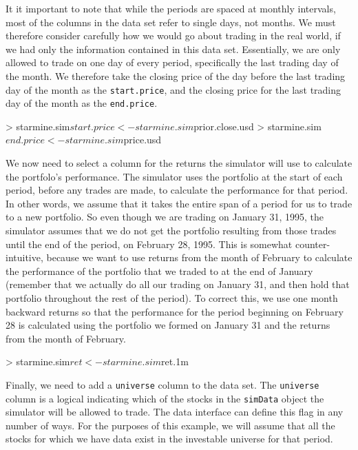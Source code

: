 \documentclass{article}
\begin{document}
It it important to note that while the periods are spaced at monthly
intervals, most of the columns in the data set refer to single days,
not months.  We must therefore consider carefully how we would go
about trading in the real world, if we had only the information
contained in this data set.  Essentially, we are only allowed to trade
on one day of every period, specifically the last trading day of the
month.  We therefore take the closing price of the day before the last
trading day of the month as the \texttt{start.price}, and the closing
price for the last trading day of the month as the \texttt{end.price}.

\begin{Schunk}
\begin{Sinput}
> starmine.sim$start.price <- starmine.sim$prior.close.usd
> starmine.sim$end.price <- starmine.sim$price.usd
\end{Sinput}
\end{Schunk}

We now need to select a column for the returns the simulator will use
to calculate the portfolo's performance.  The simulator uses the
portfolio at the start of each period, before any trades are made, to
calculate the performance for that period.  In other words, we assume
that it takes the entire span of a period for us to trade to a new
portfolio.  So even though we are trading on January 31, 1995, the
simulator assumes that we do not get the portfolio resulting from those
trades until the end of the period, on February 28, 1995.  This is
somewhat counter-intuitive, because we want to use returns from the
month of February to calculate the performance of the portfolio that
we traded to at the end of January (remember that we actually do all
our trading on January 31, and then hold that portfolio throughout the
rest of the period).  To correct this, we use one month backward
returns so that the performance for the period beginning on February
28 is calculated using the portfolio we formed on January 31 and the
returns from the month of February.

\begin{Schunk}
\begin{Sinput}
> starmine.sim$ret <- starmine.sim$ret.1m
\end{Sinput}
\end{Schunk}

Finally, we need to add a \texttt{universe} column to the data set.
The \texttt{universe} column is a logical indicating which of the
stocks in the \texttt{simData} object the simulator will be allowed to
trade.  The data interface can define this flag in any number of ways.
For the purposes of this example, we will assume that all the stocks
for which we have data exist in the investable universe for that
period.
\end{document}
